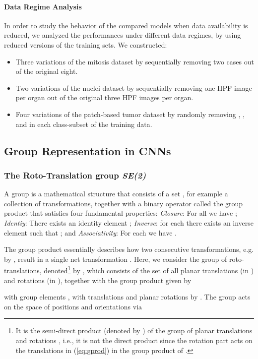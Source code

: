 \documentclass[twocolumn,final]{article}
\newcommand{\se}[1]{\textit{SE(#1)}}
\begin{document}
\paragraph{Data Regime Analysis}
In order to study the behavior of the compared models when data availability is reduced, we analyzed the performances under different data regimes, by using reduced versions of the training sets.
We constructed:
\begin{itemize}
\setlength\itemsep{-0.5em}
\item Three variations of the mitosis dataset by sequentially removing two cases out of the original eight. 
\item Two variations of the nuclei dataset by sequentially removing one HPF image per organ out of the original three HPF images per organ.
\item Four variations of the patch-based tumor dataset by randomly removing , ,  and  in each class-subset of the training data.
\end{itemize}


\subsection{Group Representation in CNNs}
\label{gCNNrepresentation}
\subsubsection{The Roto-Translation group \se{2}}
A group is a mathematical structure that consists of a set , for example a collection of transformations, together with a binary operator  called the group product that satisfies four fundamental properties: \textit{Closure}: For all  we have ; \textit{Identiy}: There exists an identity element ; \textit{Inverse}: for each  there exists an inverse element  such that ; and \textit{Associativity}: For each  we have . 

The group product essentially describes how two consecutive transformations, e.g. by , result in a single net transformation . Here, we consider the group of roto-translations, denoted\footnote{It is the semi-direct product (denoted by ) of the group of planar translations  and rotations , i.e., it is not the direct product since the rotation part acts on the translations in (\ref{eq:gprod}) in the group product of .} by , which consists of the set of all planar translations (in ) and rotations (in ), together with the group product given by

with group elements , with translations  and planar rotations by . 
The group acts on the space of positions and orientations  via
\end{document}
